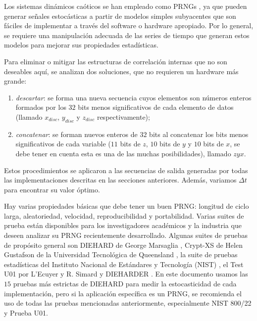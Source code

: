 Los sistemas dinámicos caóticos se han empleado como PRNGs \cite{Kocarev2003, Larrondo2006, DeMicco2009}, ya que pueden generar señales estocásticas a partir de modelos simples subyacentes que son fáciles de implementar a través del software o hardware apropiado.
Por lo general, se requiere una manipulación adecuada de las series de tiempo que generan estos modelos para mejorar sus propiedades estadísticas.

Para eliminar o mitigar las estructuras de correlación internas que no son deseables aquí, se analizan dos soluciones, que no requieren un hardware más grande:
\begin{enumerate}
\item \textit{descartar}: se forma una nueva secuencia cuyos elementos son números enteros formados por los $32$ bits menos significativos de cada elemento de datos (llamado $x_{disc}$, $y_{disc}$ y $z_{disc}$ respectivamente);
\item \textit{concatenar}: se forman nuevos enteros de $32$ bits al concatenar los bits menos significativos de cada variable ($11$ bits de $z$, $10$ bits de $y$ y $10$ bits de $x$, se debe tener en cuenta esta es una de las muchas posibilidades), llamado $zyx$.
\end{enumerate}

Estos procedimientos se aplicaron a las secuencias de salida generadas por todas las implementaciones descritas en las secciones anteriores.
Además, variamos $\Delta t$ para encontrar su valor óptimo.

Hay varias propiedades básicas que debe tener un buen PRNG: longitud de ciclo larga, aleatoriedad, velocidad, reproducibilidad y portabilidad.
Varias suites de prueba \cite{Soto} están disponibles para los investigadores académicos y la industria que deseen analizar su PRNG recientemente desarrollado.
Algunas suites de pruebas de propósito general son DIEHARD de George Marsaglia \cite{Marsaglia1995}, Crypt-XS de Helen Gustafson de la Universidad Tecnológica de Queensland \cite{Gustafson1994}, la suite de pruebas estadísticas del Instituto Nacional de Estándares y Tecnología (NIST) \cite{Rukhin2000}, el Test U01 por L'Ecuyer y R. Simard \cite{Lecuyer2007} y DIEHARDER \cite{Brown2012}.
En este documento usamos las $15$ pruebas más estrictas de DIEHARD \cite{Marsaglia1995} para medir la estocasticidad de cada implementación, pero si la aplicación específica es un PRNG, se recomienda el uso de todas las pruebas mencionadas anteriormente, especialmente NIST 800/22 y Prueba U01.

